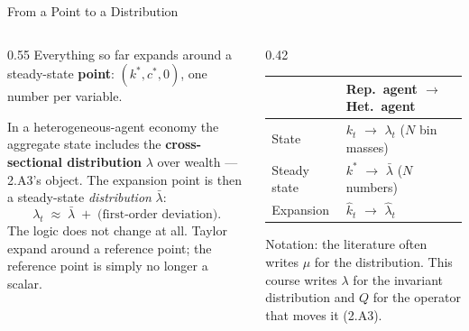 \begin{frame}{From a Point to a Distribution}
\begin{columns}[T]
\begin{column}{0.55\textwidth}
\small
Everything so far expands around a steady-state \textbf{point}: $(k^{*},c^{*},0)$, one number per variable.
\medskip

In a heterogeneous-agent economy the aggregate state includes the \textbf{cross-sectional distribution} $\lambda$ over wealth --- 2.A3's object. The expansion point is then a steady-state \emph{distribution} $\bar{\lambda}$:
\[
  \lambda_t \;\approx\; \bar{\lambda} \;+\; \text{(first-order deviation)} .
\]
\medskip
The logic does not change at all. Taylor expand around a reference point; the reference point is simply no longer a scalar.
\end{column}
\begin{column}{0.42\textwidth}
\begin{center}\footnotesize
\begin{tabularx}{\linewidth}{@{}>{\raggedright\arraybackslash}p{1.5cm} >{\raggedright\arraybackslash}X@{}}
\toprule
 & \textbf{Rep.\ agent $\to$ Het.\ agent} \\
\midrule
State & $k_t$ $\to$ $\lambda_t$ ($N$ bin masses) \\
Steady state & $k^{*}$ $\to$ $\bar{\lambda}$ ($N$ numbers) \\
Expansion & $\hat{k}_t$ $\to$ $\hat{\lambda}_t$ \\
\bottomrule
\end{tabularx}
\end{center}
\medskip
\begin{examplebox}\footnotesize
Notation: the literature often writes $\mu$ for the distribution. This course writes $\lambda$ for the invariant distribution and $Q$ for the operator that moves it (2.A3).
\end{examplebox}
\end{column}
\end{columns}
\vspace{1mm}
\end{frame}

